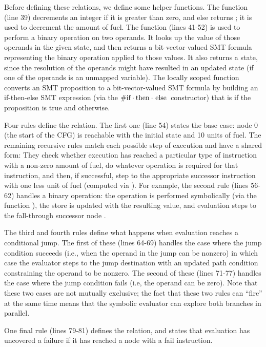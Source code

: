 \documentclass[acmsmall,screen,nonacm]{acmart}
\theoremstyle{definition}
\begin{document}
Before defining these relations, we define some helper functions.
The function  (line 39) decrements an integer if it is greater than
zero, and else returns ; it is used to decrement the amount of fuel.
The function  (lines 41-52) is used to perform a binary operation
on two operands.
It looks up the value of those operands in the given state, and then returns a
bit-vector-valued SMT formula representing the binary operation applied to
those values.
It also returns a state, since the resolution of the operands might have
resulted in an updated state (if one of the operands is an unmapped variable).
The locally scoped function  converts an SMT proposition to a bit-vector-valued SMT formula by building an if-then-else SMT expression (via the
$\ic{\#if} \cdot \ic{then} \cdot \ic{else}$ constructor) that is  if the
proposition is true and  otherwise.

Four rules define the  relation.
The first one (line 54) states the base case: node 0 (the start of the CFG) is
reachable with the initial state and 10 units of fuel.
The remaining recursive rules match each possible step of execution and have a
shared form:
They check whether execution has reached a particular type of instruction with
a non-zero amount of fuel, do whatever operation is required for that
instruction, and then, if successful, step to the appropriate successor
instruction with one less unit of fuel (computed via ). 
For example, the second rule (lines 56-62) handles a binary operation: the operation is
performed symbolically (via the function ), the store is updated
with the resulting value, and evaluation steps to the fall-through successor
node .

The third and fourth rules define what happens when evaluation reaches a
conditional jump.
The first of these (lines 64-69) handles the case where the jump condition
succeeds (i.e., when the operand in the jump can be nonzero) in which case the
evaluator steps to the jump destination  with an updated path condition
constraining the operand to be nonzero.
The second of these (lines 71-77) handles the case where the jump condition
fails (i.e, the operand can be zero).
Note that these two cases are not mutually exclusive; the fact that these two
rules can ``fire'' at the same time means that the symbolic evaluator can
explore both branches in parallel.

One final rule (lines 79-81) defines the  relation, and states that
evaluation has uncovered a failure if it has reached a node with a fail
instruction.
\end{document}
